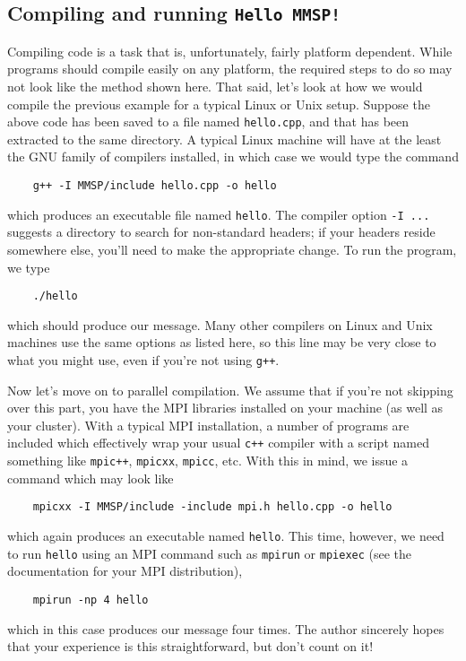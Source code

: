 \documentclass{article}
\begin{document}
\subsection{Compiling and running {\tt Hello MMSP!}}
Compiling code is a task that is, unfortunately, fairly platform dependent.  While \MMSP programs should compile easily on any platform, the required steps to do so may not look like the method shown here.  That said, let's look at how we would compile the previous example for a typical Linux or Unix setup.  Suppose the above code has been saved to a file named {\tt hello.cpp}, and that \MMSP has been extracted to the same directory.  A typical Linux machine will have at the least the GNU family of compilers installed, in which case we would type the command 
\begin{shadebox}
\begin{verbatim}
    g++ -I MMSP/include hello.cpp -o hello
\end{verbatim}
\end{shadebox}
which produces an executable file named {\tt hello}.  The compiler option {\tt -I ...} suggests a directory to search for non-standard headers; if your \MMSP headers reside somewhere else, you'll need to make the appropriate change.  To run the program, we type
\begin{shadebox}
\begin{verbatim}
    ./hello
\end{verbatim}
\end{shadebox}
which should produce our message.  Many other compilers on Linux and Unix machines use the same options as listed here, so this line may be very close to what you might use, even if you're not using {\tt g++}.

Now let's move on to parallel compilation.  We assume that if you're not skipping over this part, you have the MPI libraries installed on your machine (as well as your cluster).  With a typical MPI installation, a number of programs are included which effectively wrap your usual {\tt c++} compiler with a script named something like {\tt mpic++}, {\tt mpicxx}, {\tt mpicc}, etc.  With this in mind, we issue a command which may look like
\begin{shadebox}
\begin{verbatim}
    mpicxx -I MMSP/include -include mpi.h hello.cpp -o hello
\end{verbatim}
\end{shadebox}
which again produces an executable named {\tt hello}.  This time, however, we need to run {\tt hello} using an MPI command such as {\tt mpirun} or {\tt mpiexec} (see the documentation for your MPI distribution),
\begin{shadebox}
\begin{verbatim}
    mpirun -np 4 hello
\end{verbatim}
\end{shadebox}
which in this case produces our message four times.  The author sincerely hopes that your experience is this straightforward, but don't count on it!
\end{document}
